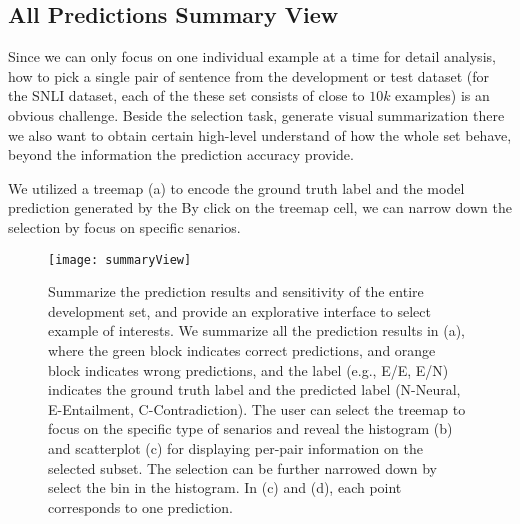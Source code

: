 \subsection{All Predictions Summary View}
\label{sec:allPairs}
Since we can only focus on one individual example at a time for detail analysis,
how to pick a single pair of sentence from the development or test dataset (for the SNLI dataset, each of the these set consists of close to $10k$ examples) is an obvious challenge.
%
Beside the selection task, generate visual summarization there we also want to obtain certain high-level understand of how the whole set behave, beyond the information the prediction accuracy provide.

We utilized a treemap (a) to encode the ground truth label and the model prediction generated by the
By click on the treemap cell, we can narrow down the selection by focus on specific senarios.


\begin{figure}[htbp]
\centering
\vspace{-2mm}
 \texttt{[image: summaryView]}
 \caption{
Summarize the prediction results and sensitivity of the entire development set, and provide an explorative interface to select example of interests.
We summarize all the prediction results in (a), where the green block indicates correct predictions, and orange block indicates wrong predictions, and the label (e.g., E/E, E/N) indicates the ground truth label and the predicted label (N-Neural, E-Entailment, C-Contradiction).
%
The user can select the treemap to focus on the specific type of senarios and reveal the histogram (b) and scatterplot (c) for displaying per-pair information on the selected subset.
The selection can be further narrowed down by select the bin in the histogram.
In (c) and (d), each point corresponds to one prediction.
 }
\label{fig:modelPipeline}
\end{figure}

